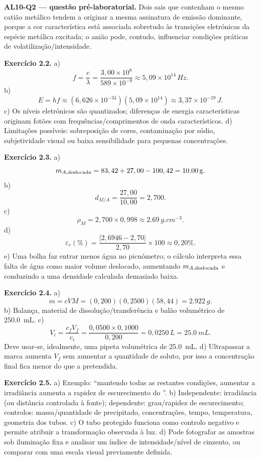 \documentclass[11pt,a4paper,openany]{book}
\begin{document}
\medskip
\textbf{AL10-Q2 — questão pré-laboratorial.} Dois sais que contenham o mesmo catião metálico tendem a originar a mesma assinatura de emissão dominante, porque a cor característica está associada sobretudo às transições eletrónicas da espécie metálica excitada; o anião pode, contudo, influenciar condições práticas de volatilização/intensidade.

\medskip
\textbf{Exercício 2.2.} a)
\[
f=\frac{c}{\lambda}=\frac{3,00\times10^8}{589\times10^{-9}}
\approx5,09\times10^{14}\,\si{Hz}.
\]
b)
\[
E=hf\approx(6,626\times10^{-34})(5,09\times10^{14})
\approx3,37\times10^{-19}\,\si{J}.
\]
c) Os níveis eletrónicos são quantizados; diferenças de energia características originam fotões com frequências/comprimentos de onda característicos. d) Limitações possíveis: sobreposição de cores, contaminação por sódio, subjetividade visual ou baixa sensibilidade para pequenas concentrações.

\medskip
\textbf{Exercício 2.3.} a)
\[
m_{A,\rm deslocada}=83,42+27,00-100,42=\SI{10.00}{g}.
\]
b)
\[
d_{M/A}=\frac{27,00}{10,00}=2,700.
\]
c)
\[
\rho_M=2,700\times0,998\approx\SI{2.69}{g.cm^{-3}}.
\]
d)
\[
\varepsilon_r(\%)=\frac{|2,6946-2,70|}{2,70}\times100\approx0,20\%.
\]
e) Uma bolha faz entrar menos água no picnómetro; o cálculo interpreta essa falta de água como maior volume deslocado, aumentando $m_{A,\rm deslocada}$ e conduzindo a uma densidade calculada demasiado baixa.

\medskip
\textbf{Exercício 2.4.} a)
\[
m=cVM=(0,200)(0,2500)(58,44)=\SI{2.922}{g}.
\]
b) Balança, material de dissolução/transferência e balão volumétrico de \SI{250.0}{mL}. c)
\[
V_i=\frac{c_fV_f}{c_i}=\frac{0,0500\times0,1000}{0,200}=0,0250\,\si{L}=\SI{25.0}{mL}.
\]
Deve usar-se, idealmente, uma pipeta volumétrica de \SI{25.0}{mL}. d) Ultrapassar a marca aumenta $V_f$ sem aumentar a quantidade de soluto, por isso a concentração final fica menor do que a pretendida.

\medskip
\textbf{Exercício 2.5.} a) Exemplo: ``mantendo todas as restantes condições, aumentar a irradiância aumenta a rapidez de escurecimento do ''. b) Independente: irradiância (ou distância controlada à fonte); dependente: grau/rapidez de escurecimento; controlos: massa/quantidade de precipitado, concentrações, tempo, temperatura, geometria dos tubos. c) O tubo protegido funciona como controlo negativo e permite atribuir a transformação observada à luz. d) Pode fotografar as amostras sob iluminação fixa e analisar um índice de intensidade/nível de cinzento, ou comparar com uma escala visual previamente definida.
\end{document}
